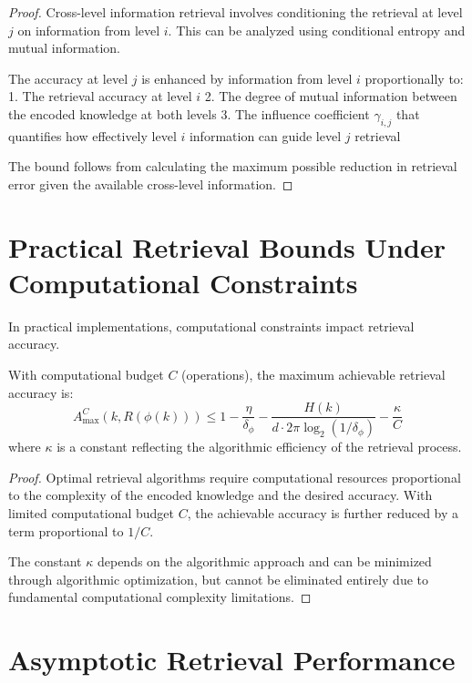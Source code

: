 \begin{proof}
Cross-level information retrieval involves conditioning the retrieval at level $j$ on information from level $i$. This can be analyzed using conditional entropy and mutual information.

The accuracy at level $j$ is enhanced by information from level $i$ proportionally to:
1. The retrieval accuracy at level $i$
2. The degree of mutual information between the encoded knowledge at both levels
3. The influence coefficient $\gamma_{i,j}$ that quantifies how effectively level $i$ information can guide level $j$ retrieval

The bound follows from calculating the maximum possible reduction in retrieval error given the available cross-level information.
\end{proof}

\section{Practical Retrieval Bounds Under Computational Constraints}

In practical implementations, computational constraints impact retrieval accuracy.

\begin{theorem}
With computational budget $C$ (operations), the maximum achievable retrieval accuracy is:
\begin{equation}
A_{\max}^C(k, R(\phi(k))) \leq 1 - \frac{\eta}{\delta_\phi} - \frac{H(k)}{d \cdot 2\pi \log_2(1/\delta_\phi)} - \frac{\kappa}{C}
\end{equation}
where $\kappa$ is a constant reflecting the algorithmic efficiency of the retrieval process.
\end{theorem}

\begin{proof}
Optimal retrieval algorithms require computational resources proportional to the complexity of the encoded knowledge and the desired accuracy. With limited computational budget $C$, the achievable accuracy is further reduced by a term proportional to $1/C$.

The constant $\kappa$ depends on the algorithmic approach and can be minimized through algorithmic optimization, but cannot be eliminated entirely due to fundamental computational complexity limitations.
\end{proof}

\section{Asymptotic Retrieval Performance}

